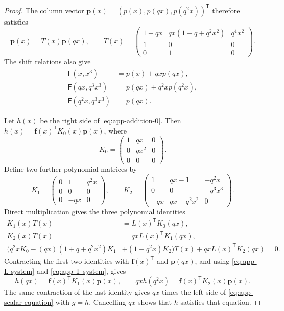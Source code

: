 \documentclass[11pt]{article}
\numberwithin{equation}{section}
\theoremstyle{remark}
\begin{document}
\begin{proof}
The column vector
\(\mathbf p(x)=(p(x),p(qx),p(q^2x))^{\mathsf T}\) therefore satisfies
\begin{equation}\label{eq:app-T-system}
 \mathbf p(x)=T(x)\mathbf p(qx),\qquad
 T(x)=\begin{pmatrix}
 1-qx&qx(1+q+q^2x^2)&q^4x^2\\1&0&0\\0&1&0
 \end{pmatrix}.
\end{equation}
The shift relations also give
\begin{equation}\label{eq:app-p-bridges}
\begin{aligned}
 \mathsf F(x,x^3)&=p(x)+qx p(qx),\\
 \mathsf F(qx,q^3x^3)&=p(qx)+q^2x p(q^2x),\\
 \mathsf F(q^2x,q^3x^3)&=p(qx).
\end{aligned}
\end{equation}

Let \(h(x)\) be the right side of \eqref{eq:app-addition-0}.
Then \(h(x)=\mathbf f(x)^{\mathsf T}K_0(x)\mathbf p(x)\), where
\[
 K_0=\begin{pmatrix}1&qx&0\\0&qx^2&0\\0&0&0\end{pmatrix}.
\]
Define two further polynomial matrices by
\[
 K_1=\begin{pmatrix}0&1&q^2x\\0&0&0\\0&-qx&0\end{pmatrix},\qquad
 K_2=\begin{pmatrix}1&qx-1&-q^2x\\
                         0&0&-q^3x^3\\-qx&qx-q^2x^2&0\end{pmatrix}.
\]
Direct multiplication gives the three polynomial identities
\begin{equation}\label{eq:app-bilinear-certificate}
\begin{aligned}
 K_1(x)T(x)&=L(x)^{\mathsf T}K_0(qx),\\
 K_2(x)T(x)&=qxL(x)^{\mathsf T}K_1(qx),\\
 \bigl(q^2xK_0-(qx)(1+q+q^2x^2)K_1
       &+(1-q^2x)K_2\bigr)T(x)
       +qxL(x)^{\mathsf T}K_2(qx)=0.
\end{aligned}
\end{equation}
Contracting the first two identities with
\(\mathbf f(x)^{\mathsf T}\) and \(\mathbf p(qx)\), and using
\eqref{eq:app-L-system} and \eqref{eq:app-T-system}, gives
\[
 h(qx)=\mathbf f(x)^{\mathsf T}K_1(x)\mathbf p(x),\qquad
 qx h(q^2x)=\mathbf f(x)^{\mathsf T}K_2(x)\mathbf p(x).
\]
The same contraction of the last identity gives \(qx\) times the
left side of \eqref{eq:app-scalar-equation} with \(g=h\).
Cancelling \(qx\) shows that \(h\) satisfies that equation.


\end{proof}
\end{document}
